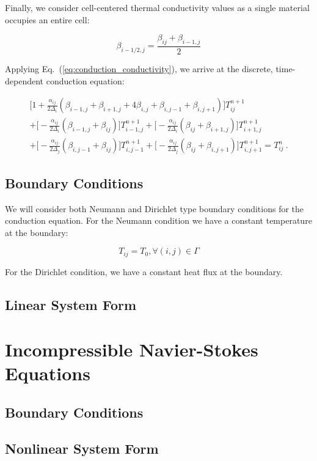 \documentclass[letterpaper,12pt]{article}
\begin{document}
Finally, we consider cell-centered thermal conductivity values as a
single material occupies an entire cell:

\begin{equation}
  \beta_{i-1/2,j} = \frac{\beta_{ij}+\beta_{i-1,j}}{2}
  \label{eq:conduction_conductivity}
\end{equation}

Applying Eq.~(\ref{eq:conduction_conductivity}), we arrive at the discrete,
time-dependent conduction equation:

\begin{multline}
 \Big[1 + \frac{\alpha_{ij}}{2\Delta_i}(\beta_{i-1,j} +
   \beta_{i+1,j} + 4 \beta_{i,j} + \beta_{i,j-1} + \beta_{i,j+1})\Big]
 T^{n+1}_{ij} \\
 + \Big[-\frac{\alpha_{ij}}{2 \Delta_i}
   (\beta_{i-1,j}+\beta_{ij})\Big] T^{n+1}_{i-1,j}
 + \Big[-\frac{\alpha_{ij}}{2 \Delta_i}(\beta_{ij}+\beta_{i+1,j})\Big]
 T^{n+1}_{i+1,j} \\
 + \Big[-\frac{\alpha_{ij}}{2 \Delta_j}
   (\beta_{i,j-1}+\beta_{ij})\Big] T^{n+1}_{i,j-1} +
 \Big[-\frac{\alpha_{ij}}{2 \Delta_j}(\beta_{ij}+\beta_{i,j+1})\Big]
 T^{n+1}_{i,j+1} = T^n_{ij}\:.
 \label{eq:conduction_discrete_equation}
\end{multline}


\subsection{Boundary Conditions}

We will consider both Neumann and Dirichlet type boundary conditions
for the conduction equation. For the Neumann condition we have a
constant temperature at the boundary:

\begin{equation}
  T_{ij} = T_0, \forall (i,j) \in \Gamma
  \label{eq:conduction_neumann}
\end{equation}

For the Dirichlet condition, we have a constant heat flux at the boundary.

\subsection{Linear System Form}

\section{Incompressible Navier-Stokes Equations}

\subsection{Boundary Conditions}

\subsection{Nonlinear System Form}

\pagebreak
 
\end{document}
